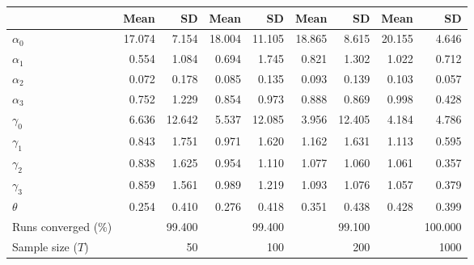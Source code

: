 
\begin{tabular}[t]{lrrrrrrrr}
\toprule
  & Mean & SD & Mean  & SD  & Mean   & SD   & Mean    & SD   \\
\midrule
$\alpha_{0}$ & 17.074 & 7.154 & 18.004 & 11.105 & 18.865 & 8.615 & 20.155 & 4.646\\
$\alpha_{1}$ & 0.554 & 1.084 & 0.694 & 1.745 & 0.821 & 1.302 & 1.022 & 0.712\\
$\alpha_{2}$ & 0.072 & 0.178 & 0.085 & 0.135 & 0.093 & 0.139 & 0.103 & 0.057\\
$\alpha_{3}$ & 0.752 & 1.229 & 0.854 & 0.973 & 0.888 & 0.869 & 0.998 & 0.428\\
$\gamma_{0}$ & 6.636 & 12.642 & 5.537 & 12.085 & 3.956 & 12.405 & 4.184 & 4.786\\
$\gamma_{1}$ & 0.843 & 1.751 & 0.971 & 1.620 & 1.162 & 1.631 & 1.113 & 0.595\\
$\gamma_{2}$ & 0.838 & 1.625 & 0.954 & 1.110 & 1.077 & 1.060 & 1.061 & 0.357\\
$\gamma_{3}$ & 0.859 & 1.561 & 0.989 & 1.219 & 1.093 & 1.076 & 1.057 & 0.379\\
$\theta$ & 0.254 & 0.410 & 0.276 & 0.418 & 0.351 & 0.438 & 0.428 & 0.399\\
Runs converged (\%) &  & 99.400 &  & 99.400 &  & 99.100 &  & 100.000\\
Sample size ($T$) &  & 50 &  & 100 &  & 200 &  & 1000\\
\bottomrule
\end{tabular}
